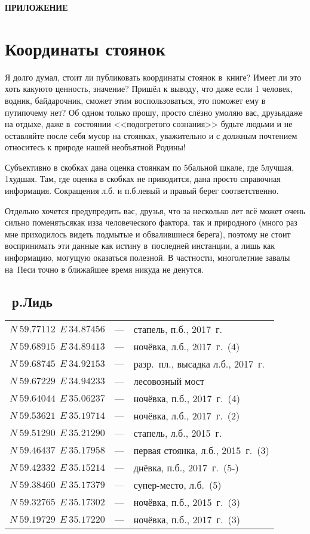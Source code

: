 \afterpage{\blankpage}
\newpage
\appendix
\pagestyle{empty}
{\hfill\large\textbf{ПРИЛОЖЕНИЕ}}
\section*{Координаты стоянок}
Я долго думал, стоит ли публиковать координаты стоянок в~книге? Имеет ли это хоть какую\sdash то ценность, значение? Пришёл к выводу, что даже если 1 человек, водник, байдарочник, сможет этим воспользоваться, это поможет ему в пути\mdash почему нет? Об одном только прошу, просто слёзно умоляю вас, друзья\mdash даже на отдыхе, даже в~состоянии <<подогретого сознания>> будьте людьми и не оставляйте после себя мусор на стоянках, уважительно и с должным почтением относитесь к природе нашей необъятной Родины! 

Субъективно в скобках дана оценка стоянкам по 5\sdash бальной шкале, где 5\ndash лучшая, 1\ndash худшая. Там, где оценка в скобках не приводится, дана просто справочная информация. Сокращения л.б. и п.б.\mdash левый и правый берег соответственно.

Отдельно хочется предупредить вас, друзья, что за несколько лет всё может очень сильно поменяться\mdash как из\sdash за человеческого фактора, так и природного (много раз мне приходилось видеть подмытые и обвалившиеся берега), поэтому не стоит воспринимать эти данные как истину в~последней инстанции, а лишь как информацию, могущую оказаться полезной. В частности, многолетние завалы на~Песи точно в ближайшее время никуда не денутся.

\newpage 
\subsection*{~р.Лидь}
\begin{longtable}[c]{>{\raggedright}m{40mm} >{\raggedleft}m{7mm}>{\raggedright}p{65mm} }		
${N~59.77112~~E~34.87456}$ & --- & стапель, п.б., 2017~г.\tabularnewline
${N~59.68915~~E~34.89413}$ & --- & ночёвка, л.б., 2017~г.~(4)\tabularnewline
${N~59.68745~~E~34.92153}$ & --- & разр.~пл., высадка л.б., 2017~г.\tabularnewline
${N~59.67229~~E~34.94233}$ & --- & лесовозный мост\tabularnewline
${N~59.64044~~E~35.06237}$ & --- & ночёвка, п.б., 2017~г.~(4)\tabularnewline
${N~59.53621~~E~35.19714}$ & --- & ночёвка, л.б., 2017~г.~(2)\tabularnewline
${N~59.51290~~E~35.21290}$ & --- & стапель, л.б., 2015~г.\tabularnewline
${N~59.46437~~E~35.17958}$ & --- & первая стоянка, л.б., 2015~г.~(3)\tabularnewline
${N~59.42332~~E~35.15214}$ & --- & днёвка, п.б., 2017~г.~(5-)\tabularnewline
${N~59.38460~~E~35.17379}$ & --- & супер-место, л.б.~(5)\tabularnewline
${N~59.32765~~E~35.17302}$ & --- & ночёвка, п.б., 2015~г.~(3)\tabularnewline 
${N~59.19729~~E~35.17220}$ & --- & ночёвка, п.б., 2017~г.~(3)\tabularnewline
\end{longtable}

